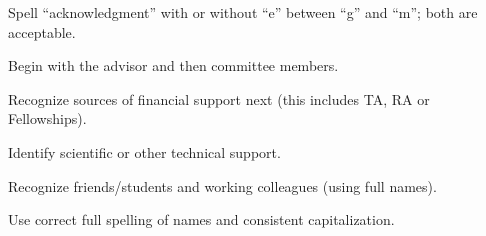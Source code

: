 Spell ``acknowledgment'' with or without ``e'' between ``g'' and ``m''; both are acceptable.
%

Begin with the advisor and then committee members.
%

Recognize sources of financial support next (this includes TA, RA or Fellowships).
%

Identify scientific or other technical support.
%

Recognize friends/students and working colleagues (using full names).
%

Use correct full spelling of names and consistent capitalization.




